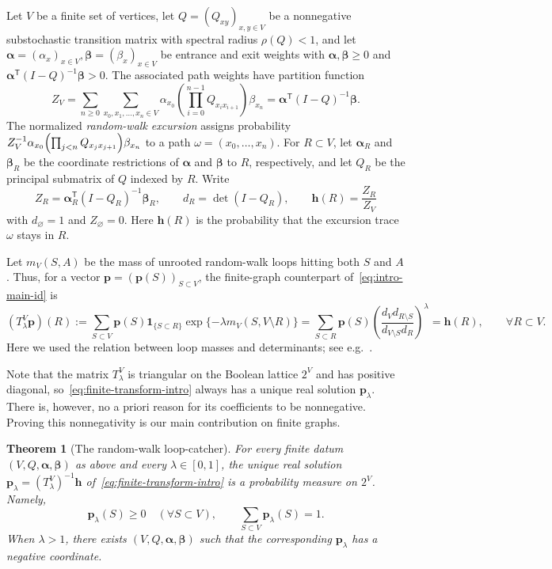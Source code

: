 \documentclass[11pt]{article}
\numberwithin{equation}{section}
\newcommand{\1}{\mathbf{1}}
\newtheorem{theorem}{Theorem}[section]
\newcommand{\one}{\mathbf 1}
\newcommand{\balpha}{\boldsymbol{\alpha}}
\newcommand{\bbeta}{\boldsymbol{\beta}}
\newcommand{\bp}{\mathbf p}
\newcommand{\bh}{\mathbf h}
\begin{document}
Let $V$ be a finite set of vertices, let $Q=(Q_{xy})_{x,y\in V}$ be a nonnegative substochastic transition matrix with spectral radius $\rho(Q)<1$, and let $\balpha=(\alpha_x)_{x\in V},\bbeta=(\beta_x)_{x\in V}$ be entrance and exit weights with $\balpha,\bbeta\ge0$ and $\balpha^{\mathsf T}(I-Q)^{-1}\bbeta>0$.  The associated path weights have partition function
\[
 Z_V=\sum_{n\ge0}\sum_{x_0,x_1,\ldots,x_n\in V}
 \alpha_{x_0}\left(\prod_{i=0}^{n-1}Q_{x_i x_{i+1}}\right)\beta_{x_n}
 =\balpha^{\mathsf T}(I-Q)^{-1}\bbeta.
\]
The normalized \emph{random-walk excursion} assigns probability $Z_V^{-1}\alpha_{x_0}\Bigl(\prod_{j<n}Q_{x_jx_{j+1}}\Bigr)\beta_{x_n}$ to a path \(\omega=(x_0,\ldots,x_n)\).
For \(R\subset V\), let \(\balpha_R\) and \(\bbeta_R\) be the coordinate restrictions of \(\balpha\) and \(\bbeta\) to \(R\), respectively, and let \(Q_R\) be the principal submatrix of \(Q\) indexed by \(R\). Write
\begin{equation}\label{eq:z-d-bh}
   Z_R=\balpha_R^{\mathsf T}(I-Q_R)^{-1}\bbeta_R,
   \qquad
   d_R=\det(I-Q_R),
   \qquad
   \bh(R)=\frac{Z_R}{Z_V}
\end{equation}
with \(d_\varnothing=1\) and \(Z_\varnothing=0\).
Here $\bh(R)$ is the probability that the excursion trace $\omega$ stays in $R$.

Let \(m_V(S,A)\) be the mass of unrooted random-walk loops hitting both $S$ and $A$.
Thus, for
a vector \(\bp=(\bp(S))_{S\subset V}\), the finite-graph counterpart of~\eqref{eq:intro-main-id} is
\begin{equation}\label{eq:finite-transform-intro}
   (T_\lambda^V\bp)(R)
   :=\sum_{S\subset V}\bp(S)\one_{\{S\subset R\}}
     \exp\{-\lambda m_V(S,V\setminus R)\}
   =\sum_{S\subset R}\bp(S)
     \left(\frac{d_Vd_{R\setminus S}}{d_{V\setminus S}d_R}\right)^\lambda
   =\bh(R),
   \qquad \forall R\subset V.
\end{equation}
Here we used the relation between loop masses and determinants; see e.g.~\cite[Proposition~5.2]{Lawler2018}.

Note that the matrix $T_\lambda^V$ is triangular on the Boolean lattice $2^V$ and has
positive diagonal, so~\eqref{eq:finite-transform-intro} always has a
unique real solution $\bp_\lambda$.  There is, however, no a priori
reason for its coefficients to be nonnegative.  Proving this nonnegativity
is our main contribution on finite graphs.

\begin{theorem}[The random-walk loop-catcher]\label{thm:finite-positivity}
For every finite datum $(V,Q,\balpha,\bbeta)$ as above and every $\lambda\in[0,1]$, the unique real solution $\bp_\lambda=(T_\lambda^V)^{-1}\bh$
of~\eqref{eq:finite-transform-intro} is a probability measure on $2^V$. Namely,
\begin{equation}
        \bp_\lambda(S)\ge0\quad(\forall S\subset V),
        \qquad
        \sum_{S\subset V}\bp_\lambda(S)=1.
\end{equation}
When $\lambda>1$, there exists $(V,Q,\balpha,\bbeta)$ such that the corresponding $\bp_\lambda$ has a negative coordinate.
\end{theorem}
\end{document}
